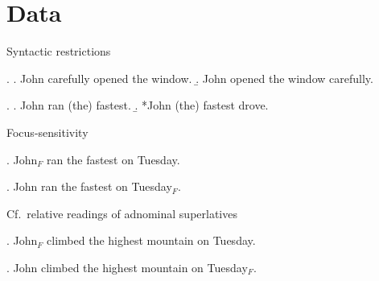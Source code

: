 \documentclass[xcolor=dvipsnames]{beamer}
\begin{document}

\section{Data}

\begin{frame}{Syntactic restrictions}

\ex.
\a. John carefully opened the window.
\b. John opened the window carefully.

\ex.
\a. John ran (the) fastest.
\b. *John (the) fastest drove.

\end{frame}


\begin{frame}{Focus-sensitivity}


\ex. John$_F$ ran the fastest on Tuesday.

\ex. John ran the fastest on Tuesday$_F$.

\end{frame}


\begin{frame}{Cf.\ relative readings of adnominal superlatives}

\ex. John$_F$ climbed the highest mountain on Tuesday.

\ex. John climbed the highest mountain on Tuesday$_F$.







\end{frame}
\end{document}
